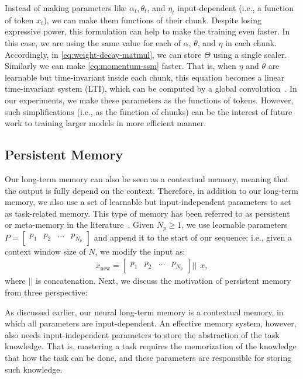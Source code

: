 Instead of making parameters like $\alpha_t, \theta_t$, and $\eta_t$ input-dependent (i.e., a function of token $x_t$), we can make them functions of their chunk. Despite losing expressive power, this formulation can help to make the training even faster. In this case, we are using the same value for each of $\alpha$, $\theta$, and $\eta$ in each chunk. Accordingly, in \autoref{eq:weight-decay-matmul}, we can store $\Theta$ using a single scaler. Similarly we can make \autoref{eq:momentum-ssm} faster. That is, when $\eta$ and $\theta$ are learnable but time-invariant inside each chunk, this equation becomes a linear time-invariant system (LTI), which can be computed by a global convolution~\citep{gu2022efficiently}. In our experiments, we make these parameters as the functions of tokens. However, such simplifications (i.e., as the function of chunks) can be the interest of future work to training larger models in more efficient manner.   




\subsection{Persistent Memory}\label{sec:persistent-memory}
Our long-term memory can also be seen as a contextual memory, meaning that the output is fully depend on the context. Therefore, in addition to our long-term memory, we also use a set of learnable but input-independent parameters to act as task-related memory. This type of memory has been referred to as persistent or meta-memory in the literature~\citep{sukhbaatar2019augmenting, dong2024hymba}. Given $N_p \geq 1$, we use learnable parameters $P = \begin{bmatrix}
    p_1 & p_2 & \dots & p_{N_p}
\end{bmatrix}$ and append it to the start of our sequence: i.e., given a context window size of $N$, we modify the input as:
\begin{align}
    x_{\text{new}} = \begin{bmatrix}
    p_1 & p_2 & \dots & p_{N_p}
\end{bmatrix} || \: \: x, 
\end{align}
where $||$ is concatenation. Next, we discuss the motivation of persistent memory from three perspective:




As discussed earlier, our neural long-term memory is a contextual memory, in which all parameters are input-dependent. An effective memory system, however, also needs input-independent parameters to store the abstraction of the task knowledge. That is, mastering a task requires the memorization of the knowledge that how the task can be done, and these parameters are responsible for storing such knowledge. 



